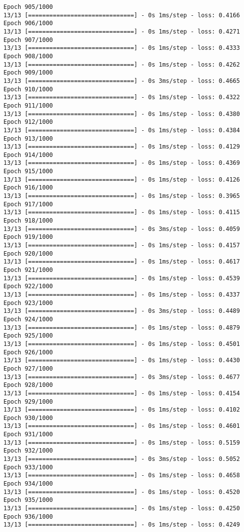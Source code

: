 \documentclass[11pt]{article}
\begin{document}
\begin{Verbatim}[commandchars=\\\{\}]
Epoch 905/1000
13/13 [==============================] - 0s 1ms/step - loss: 0.4166
Epoch 906/1000
13/13 [==============================] - 0s 1ms/step - loss: 0.4271
Epoch 907/1000
13/13 [==============================] - 0s 1ms/step - loss: 0.4333
Epoch 908/1000
13/13 [==============================] - 0s 1ms/step - loss: 0.4262
Epoch 909/1000
13/13 [==============================] - 0s 3ms/step - loss: 0.4665
Epoch 910/1000
13/13 [==============================] - 0s 1ms/step - loss: 0.4322
Epoch 911/1000
13/13 [==============================] - 0s 1ms/step - loss: 0.4380
Epoch 912/1000
13/13 [==============================] - 0s 1ms/step - loss: 0.4384
Epoch 913/1000
13/13 [==============================] - 0s 1ms/step - loss: 0.4129
Epoch 914/1000
13/13 [==============================] - 0s 1ms/step - loss: 0.4369
Epoch 915/1000
13/13 [==============================] - 0s 1ms/step - loss: 0.4126
Epoch 916/1000
13/13 [==============================] - 0s 1ms/step - loss: 0.3965
Epoch 917/1000
13/13 [==============================] - 0s 1ms/step - loss: 0.4115
Epoch 918/1000
13/13 [==============================] - 0s 3ms/step - loss: 0.4059
Epoch 919/1000
13/13 [==============================] - 0s 1ms/step - loss: 0.4157
Epoch 920/1000
13/13 [==============================] - 0s 1ms/step - loss: 0.4617
Epoch 921/1000
13/13 [==============================] - 0s 1ms/step - loss: 0.4539
Epoch 922/1000
13/13 [==============================] - 0s 1ms/step - loss: 0.4337
Epoch 923/1000
13/13 [==============================] - 0s 3ms/step - loss: 0.4489
Epoch 924/1000
13/13 [==============================] - 0s 1ms/step - loss: 0.4879
Epoch 925/1000
13/13 [==============================] - 0s 1ms/step - loss: 0.4501
Epoch 926/1000
13/13 [==============================] - 0s 1ms/step - loss: 0.4430
Epoch 927/1000
13/13 [==============================] - 0s 3ms/step - loss: 0.4677
Epoch 928/1000
13/13 [==============================] - 0s 1ms/step - loss: 0.4154
Epoch 929/1000
13/13 [==============================] - 0s 1ms/step - loss: 0.4102
Epoch 930/1000
13/13 [==============================] - 0s 1ms/step - loss: 0.4601
Epoch 931/1000
13/13 [==============================] - 0s 1ms/step - loss: 0.5159
Epoch 932/1000
13/13 [==============================] - 0s 3ms/step - loss: 0.5052
Epoch 933/1000
13/13 [==============================] - 0s 1ms/step - loss: 0.4658
Epoch 934/1000
13/13 [==============================] - 0s 1ms/step - loss: 0.4520
Epoch 935/1000
13/13 [==============================] - 0s 1ms/step - loss: 0.4250
Epoch 936/1000
13/13 [==============================] - 0s 1ms/step - loss: 0.4249

\end{Verbatim}
\end{document}
